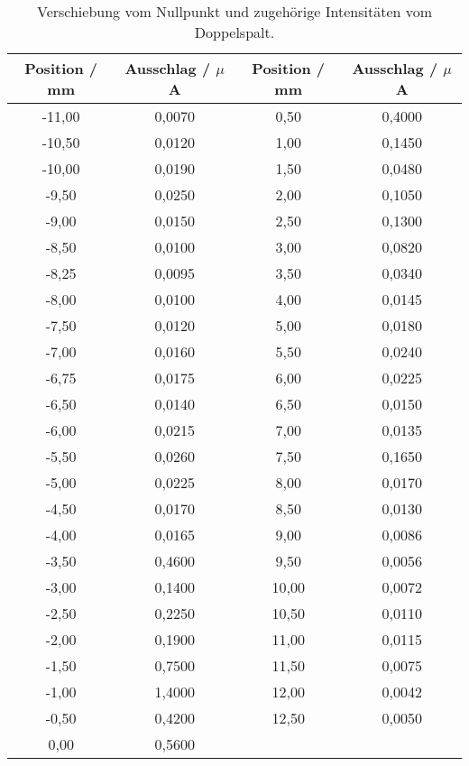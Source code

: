 \begin{table}[!htp]
\centering
\caption{Verschiebung vom Nullpunkt und zugehörige Intensitäten vom Doppelspalt.}
\label{tab:doppel}
\begin{tabular}{c c c c}
\toprule
{{Position / mm}} & {{Ausschlag / $\mu$ A}} & {{Position / mm}} & {{Ausschlag / $\mu$ A}} \\
\midrule
-11,00  &  0,0070  &0,50  &  0,4000    \\
-10,50  &  0,0120  &1,00  &  0,1450  \\
-10,00  &  0,0190  &1,50  &  0,0480  \\
-9,50   &  0,0250  &2,00  &  0,1050  \\
-9,00   &  0,0150  &2,50  &  0,1300   \\
-8,50   &  0,0100  &3,00  &  0,0820  \\
-8,25   &  0,0095  &3,50  &  0,0340  \\
-8,00   &  0,0100  &4,00  &  0,0145 \\
-7,50   &  0,0120  &5,00  &  0,0180  \\
-7,00   &  0,0160  &5,50  &  0,0240  \\
-6,75   &  0,0175  &6,00  &  0,0225 \\
-6,50   &  0,0140  &6,50  &  0,0150  \\
-6,00   &  0,0215  &7,00  &  0,0135 \\
-5,50   &  0,0260  &7,50  &  0,1650  \\
-5,00   &  0,0225  &8,00  &  0,0170  \\
-4,50   &  0,0170  &8,50  &  0,0130  \\
-4,00   &  0,0165  &9,00  &  0,0086 \\
-3,50   &  0,4600  &9,50  &  0,0056 \\
-3,00   &  0,1400  &10,00 &  0,0072 \\
-2,50   &  0,2250  &10,50 &  0,0110  \\
-2,00   &  0,1900  &11,00 &  0,0115 \\
-1,50   &  0,7500  &11,50 &  0,0075 \\
-1,00   &  1,4000  &12,00 &  0,0042 \\
-0,50   &  0,4200  &12,50 &  0,0050  \\
0,00    &  0,5600  &  & \\
\bottomrule
\end{tabular}
\end{table}